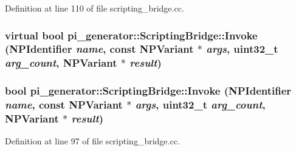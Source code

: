 Definition at line 110 of file scripting\_\-bridge.cc.

\hypertarget{classpi__generator_1_1_scripting_bridge_aed0d146930d7db6a548993629bb775f6}{
\subsubsection[{Invoke}]{\setlength{\rightskip}{0pt plus 5cm}virtual bool pi\_\-generator::ScriptingBridge::Invoke (NPIdentifier {\em name}, \/  const NPVariant $\ast$ {\em args}, \/  uint32\_\-t {\em arg\_\-count}, \/  NPVariant $\ast$ {\em result})}}
\label{classpi__generator_1_1_scripting_bridge_aed0d146930d7db6a548993629bb775f6}
\hypertarget{classpi__generator_1_1_scripting_bridge_a3518781037308ae1d63bcdf5cc77a3de}{
\subsubsection[{Invoke}]{\setlength{\rightskip}{0pt plus 5cm}bool pi\_\-generator::ScriptingBridge::Invoke (NPIdentifier {\em name}, \/  const NPVariant $\ast$ {\em args}, \/  uint32\_\-t {\em arg\_\-count}, \/  NPVariant $\ast$ {\em result})}}
\label{classpi__generator_1_1_scripting_bridge_a3518781037308ae1d63bcdf5cc77a3de}


Definition at line 97 of file scripting\_\-bridge.cc.

